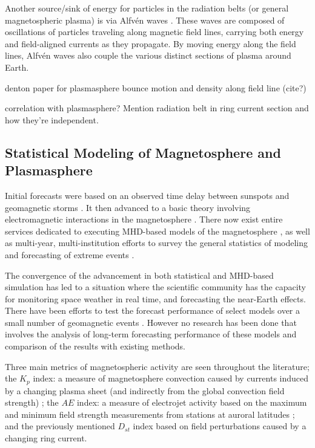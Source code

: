 Another source/sink of energy for particles in the radiation belts (or general magnetospheric plasma) is via Alfvén waves \citep{Keling2009AlfvenWaves}. These waves are composed of oscillations of particles traveling along magnetic field lines, carrying both energy and field-aligned currents as they propagate. By moving energy along the field lines, Alfvén waves also couple the various distinct sections of plasma around Earth. 

\vnote denton paper for plasmasphere bounce motion \citep{Young2008MagneticFieldLineCurvature} and density along field line (cite?)

\vnote correlation with plasmasphere? Mention radiation belt in ring current section and how they're independent. 

\subsection{Statistical Modeling of Magnetosphere and Plasmasphere}

Initial forecasts were based on an observed time delay between sunspots and geomagnetic storms \citep{SunspotStorms}. It then advanced to a basic theory involving electromagnetic interactions in the magnetosphere \cite{Chapman}. There now exist entire services dedicated to executing MHD-based models of the magnetosphere \cite{CCMC}, as well as multi-year, multi-institution efforts to survey the general statistics of modeling and forecasting of extreme events \cite{ExtremeEvents}.

The convergence of the advancement in both statistical and MHD-based simulation has led to a situation where the scientific community has the capacity for monitoring space weather in real time, and forecasting the near-Earth effects.  There have been efforts to test the forecast performance of select models over a small number of geomagnetic events \citep{ANNforecast,StormModel,StatCompStorms,Yermolaev}. However no research has been done that involves the analysis of long-term forecasting performance of these models and comparison of the results with existing methods.

Three main metrics of magnetospheric activity are seen throughout the literature; the $K_p$ index: a measure of magnetosphere convection caused by currents induced by a changing plasma sheet (and indirectly from the global convection field strength) \citep{Thomsen2004WhyKpSoGood}; the $AE$ index: a measure of electrojet activity based on the maximum and minimum field strength measurements from stations at auroral latitudes \citep{DavisSugiura1966AE}; and the previously mentioned $D_{st}$ index based on field perturbations caused by a changing ring current.

